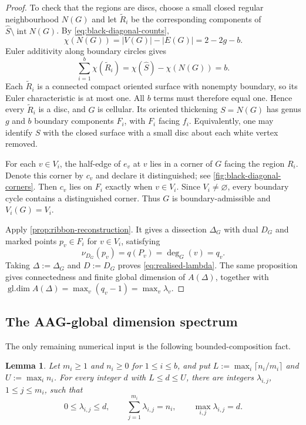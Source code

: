 \documentclass[11pt]{amsart}
\theoremstyle{definition}
\theoremstyle{plain}
\newtheorem{lemma}[lemma]{Lemma}
\theoremstyle{definition}
\theoremstyle{definition}
\newcommand{\gldim}{\operatorname{gl.dim}}
\begin{document}
\begin{proof}
To check that the regions are discs, choose a small closed regular
neighbourhood $N(G)$ and let $\widetilde R_i$ be the corresponding components
of $\widehat S\setminus\operatorname{int}N(G)$.  By
\eqref{eq:black-diagonal-counts},
\[
 \chi(N(G))=|V(G)|-|E(G)|=2-2g-b.
\]
Euler additivity along boundary circles gives
\[
 \sum_{i=1}^b\chi(\widetilde R_i)
 =\chi(\widehat S)-\chi(N(G))=b.
\]
Each $\widetilde R_i$ is a connected compact oriented surface with
nonempty boundary, so its Euler characteristic is at most one.  All $b$
terms must therefore equal one.  Hence every $\widetilde R_i$ is a disc,
and $G$ is cellular.  Its oriented thickening $S=N(G)$ has genus $g$ and
$b$ boundary components $F_i$, with $F_i$ facing $f_i$.  Equivalently,
one may identify $S$ with the closed surface with a small disc about each
white vertex removed.

For each $v\in V_i$, the half-edge of $e_v$ at $v$ lies in a
corner of $G$ facing the region $R_i$.  Denote this corner by
$c_v$ and declare it distinguished; see
\cref{fig:black-diagonal-corners}.  Then $c_v$ lies on $F_i$
exactly when $v\in V_i$.  Since $V_i\neq\varnothing$, every
boundary cycle contains a distinguished corner.  Thus $G$ is
boundary-admissible and $V_i(G)=V_i$.

Apply \cref{prop:ribbon-reconstruction}.  It gives a dissection $\Delta_G$
with dual $D_G$ and marked points $p_v\in F_i$
for $v\in V_i$, satisfying
\[
 \nu_{D_G}(p_v)=q(P_v)=\deg_G(v)=q_v.
\]
Taking $\Delta:=\Delta_G$ and $D:=D_G$ proves
\eqref{eq:realised-lambda}.  The same proposition gives connectedness and
finite global dimension of $A(\Delta)$, together with
$\gldim A(\Delta)=\max_v(q_v-1)=\max_v\lambda_v$.
\end{proof}

\subsection{The AAG-global dimension spectrum}

The only remaining numerical input is the following bounded-composition fact.

\begin{lemma}
\label{lem:bounded-distributions}
Let $m_i\geq1$ and $n_i\geq0$ for $1\leq i\leq b$, and put
$L:=\max_i\lceil n_i/m_i\rceil$ and $U:=\max_i n_i$.  For every integer
$d$ with $L\leq d\leq U$, there are integers $\lambda_{i,j}$,
$1\leq j\leq m_i$, such that
\begin{equation}
\label{eq:bounded-distributions}
 0\leq\lambda_{i,j}\leq d,
 \qquad
 \sum_{j=1}^{m_i}\lambda_{i,j}=n_i,
 \qquad
 \max_{i,j}\lambda_{i,j}=d.
\end{equation}
\end{lemma}
\end{document}
